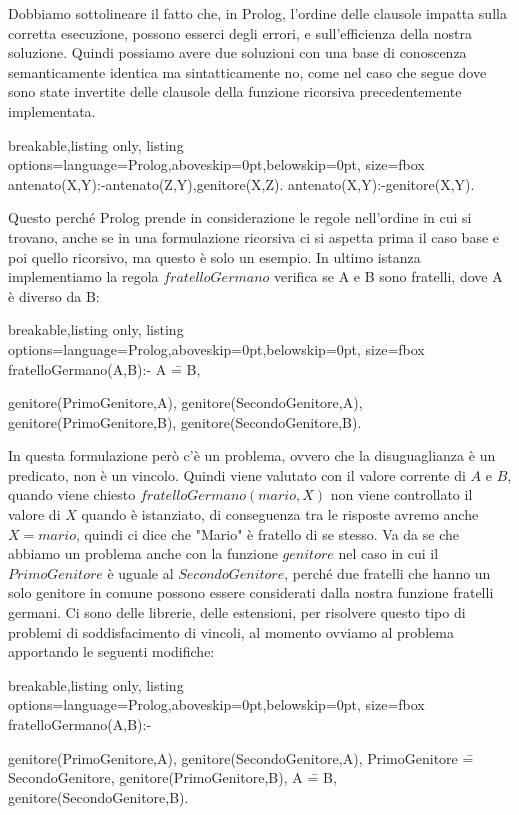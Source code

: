 Dobbiamo sottolineare il fatto che, in Prolog, l'ordine delle clausole impatta sulla corretta esecuzione, possono esserci degli errori, e sull'efficienza della nostra soluzione. 
Quindi possiamo avere due soluzioni con una base di conoscenza semanticamente identica ma sintatticamente no, come nel caso che segue dove sono state invertite delle clausole della funzione ricorsiva precedentemente implementata.
\begin{tcblisting}{breakable,listing only, listing options={language=Prolog,aboveskip=0pt,belowskip=0pt}, size=fbox}
  antenato(X,Y):-antenato(Z,Y),genitore(X,Z).
  antenato(X,Y):-genitore(X,Y).
\end{tcblisting}
Questo perché Prolog prende in considerazione le regole nell'ordine in cui si trovano, anche se in una formulazione ricorsiva ci si aspetta prima il caso base e poi quello ricorsivo, ma questo è solo un esempio.
\newline
In ultimo istanza implementiamo la regola $fratelloGermano$ verifica se A e B sono fratelli, dove A è diverso da B:
\begin{tcblisting}{breakable,listing only, listing options={language=Prolog,aboveskip=0pt,belowskip=0pt}, size=fbox}
fratelloGermano(A,B):-
    A \== B,
    
    genitore(PrimoGenitore,A),
    genitore(SecondoGenitore,A),
    genitore(PrimoGenitore,B),
    genitore(SecondoGenitore,B).
\end{tcblisting}
In questa formulazione però c'è un problema, ovvero che la disuguaglianza è un predicato, non è un vincolo. Quindi viene valutato con il valore corrente di $A$ e $B$, quando viene chiesto $fratelloGermano(mario,X)$ non viene controllato il valore di $X$ quando è istanziato, di conseguenza tra le risposte avremo anche $X=mario$, quindi ci dice che "Mario" è fratello di se stesso. Va da se che abbiamo un problema anche con la funzione $genitore$ nel caso in cui il $PrimoGenitore$ è uguale al $SecondoGenitore$, perché due fratelli che hanno un solo genitore in comune possono essere considerati dalla nostra funzione fratelli germani.
Ci sono delle librerie, delle estensioni, per risolvere questo tipo di problemi di soddisfacimento di vincoli, al momento ovviamo al problema apportando le seguenti modifiche:
\begin{tcblisting}{breakable,listing only, listing options={language=Prolog,aboveskip=0pt,belowskip=0pt}, size=fbox}
fratelloGermano(A,B):-
    
    genitore(PrimoGenitore,A),
    genitore(SecondoGenitore,A),
    PrimoGenitore \== SecondoGenitore,
    genitore(PrimoGenitore,B),
    A \== B,
    genitore(SecondoGenitore,B).
\end{tcblisting}

